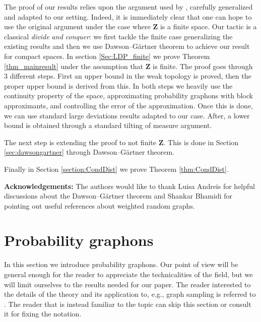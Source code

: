 \documentclass[12pt,twoside,a4paper]{article}
\newcommand{\Space}{\mathbf{Z}}
\begin{document}
The proof of our results relies upon the argument used by \cite{ChatterjeeVaradhan2011}, carefully generalized and adapted to our setting. Indeed, it is immediately clear that one can hope to use the original argument under the case where $\Space$ is a finite space. Our tactic is a classical \emph{divide and conquer}: we first tackle the finite case generalizing the existing results and then we use Dawson--G\"artner theorem to achieve our result for compact spaces. In section \ref{Sec:LDP_finite} we prove Theorem \ref{thm_mainresult} under the assumption that $\Space$ is finite. The proof goes through 3 different steps. First an upper bound in the weak topology is proved, then the proper upper bound is derived from this. In both steps we heavily use the continuity property of the space, approximating probability graphons with block approximants, and controlling the error of the approximation. Once this is done, we can use standard large deviations results adapted to our case. After, a lower bound is obtained through a standard tilting of measure argument.  

The next step is extending the proof to not finite $\Space$. This is done in Section \ref{sec:dawsongartner} through Dawson--G\"artner theorem. 

Finally in Section \ref{section:CondDist} we prove Theorem \ref{thm:CondDist}.

\vspace{15pt}
\textbf{Acknowledgements:}  The authors would like to thank Luisa Andreis for helpful discussions about the Dawson--G\"artner theorem and Shankar Bhamidi for pointing out useful references about weighted random graphs. 

\section{Probability graphons}\label{Sec2ProbGraphons}
In this section we introduce probability graphons. Our point of view will be general enough for the reader to appreciate the technicalities of the field, but we will limit ourselves to the results needed for our paper. The reader interested to the details of the theory and its application to, e.g., graph sampling is referred to \cite{abraham2023probabilitygraphons}. The reader that is instead familiar to the topic can skip this section or consult it for fixing the notation.
\end{document}
